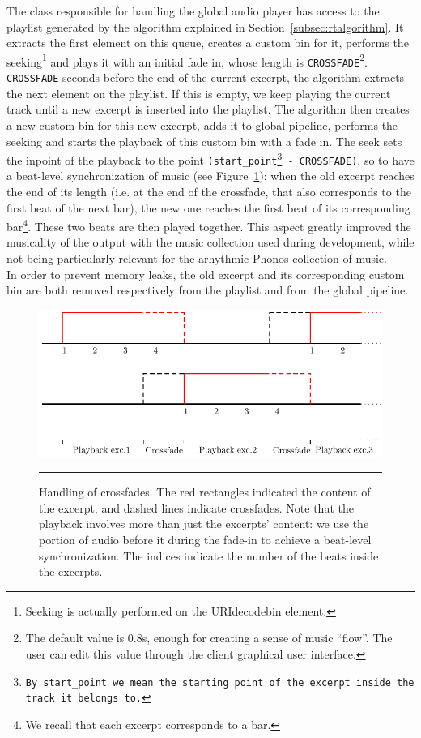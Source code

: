 The class responsible for handling the global audio player has access to the playlist generated by the algorithm explained in Section~\ref{subsec:rtalgorithm}. It extracts the first element on this queue, creates a custom bin for it, performs the seeking\footnote{Seeking is actually performed on the URIdecodebin element.} and plays it with an initial fade in, whose length is \texttt{CROSSFADE}\footnote{The default value is 0.8s, enough for creating a sense of music ``flow''. The user can edit this value through the client graphical user interface.}. \texttt{CROSSFADE} seconds before the end of the current excerpt, the algorithm extracts the next element on the playlist. If this is empty, we keep playing the current track until a new excerpt is inserted into the playlist. The algorithm then creates a new custom bin for this new excerpt, adds it to global pipeline, performs the seeking and starts the playback of this custom bin with a fade in. The seek sets the inpoint of the playback to the point \texttt{(start\_point\footnote{By \texttt{start\_point} we mean the starting point of the excerpt inside the track it belongs to.} - CROSSFADE)}, so to have a beat-level synchronization of music (see Figure~\ref{fig:crossfade}): when the old excerpt reaches the end of its length (i.e. at the end of the crossfade, that also corresponds to the first beat of the next bar), the new one reaches the first beat of its corresponding bar\footnote{We recall that each excerpt corresponds to a bar.}. These two beats are then played together. This aspect greatly improved the musicality of the output with the music collection used during development, while not being particularly relevant for the arhythmic Phonos collection of music.\\
In order to prevent memory leaks, the old excerpt and its corresponding custom bin are both removed respectively from the playlist and from the global pipeline.\\
\begin{figure}[h]
\begin{center}
\includegraphics[scale=1]{Figures/crossfade.pdf}
    \rule{27em}{0.5pt}
  \caption[Crossfade handling]{Handling of crossfades. The red rectangles indicated the content of the excerpt, and dashed lines indicate crossfades. Note that the playback involves more than just the excerpts' content: we use the portion of audio before it during the fade-in to achieve a beat-level synchronization. The indices indicate the number of the beats inside the excerpts.}
  \label{fig:crossfade}
\end{center}
\end{figure}

